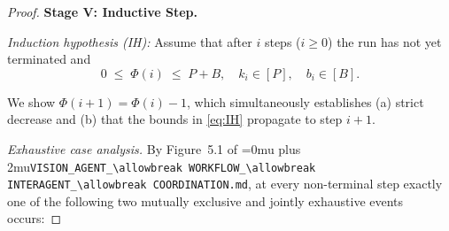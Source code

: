 \documentclass[12pt]{article}
\theoremstyle{definition}
\DeclareRobustCommand{\code}[1]{\begingroup\Urlmuskip=0mu plus 2mu\relax\nolinkurl{#1}\endgroup}
\newcommand{\VisionFlow}{\code{VISION\_AGENT\_\allowbreak WORKFLOW\_\allowbreak INTERAGENT\_\allowbreak COORDINATION.md}}
\begin{document}
\begin{proof}
\medskip
\noindent\textbf{Stage V: Inductive Step.}

\noindent\textit{Induction hypothesis (IH):} Assume that after $i$
steps ($i \geq 0$) the run has not yet terminated and
\begin{equation}
\label{eq:IH}
0 \;\leq\; \Phi(i) \;\leq\; P + B, \quad
k_i \in [P], \quad b_i \in [B].
\end{equation}

\noindent We show $\Phi(i+1) = \Phi(i) - 1$, which simultaneously
establishes (a) strict decrease and (b) that the bounds in
\eqref{eq:IH} propagate to step $i+1$.

\medskip
\noindent\textit{Exhaustive case analysis.}
By Figure~5.1 of \VisionFlow{}, at every non-terminal step exactly one of the
following two mutually exclusive and jointly exhaustive events occurs:


\end{proof}
\end{document}
